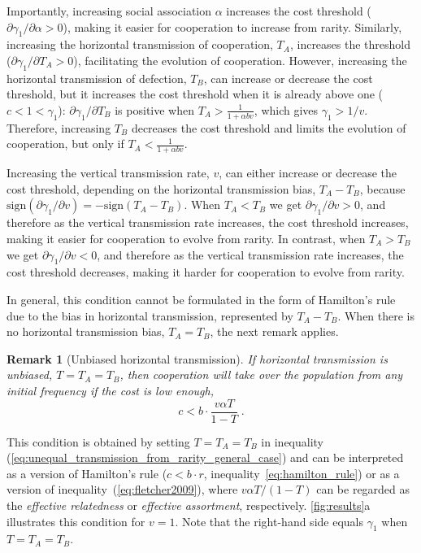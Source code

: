 \documentclass[12pt]{extarticle}
\newtheorem{remark}{Remark}
\begin{document}
Importantly, increasing social association $\alpha$ increases the cost threshold ($\partial \gamma_1 / \partial \alpha > 0$), making it easier for cooperation to increase from rarity.
Similarly, increasing the horizontal transmission of cooperation, $T_A$, increases the threshold ($\partial \gamma_1 / \partial T_A > 0$), facilitating the evolution of cooperation.
However, increasing the horizontal transmission of defection, $T_B$, can increase or decrease the cost threshold, but it increases the cost threshold when it is already above one ($c<1<\gamma_1$): $\partial\gamma_1/\partial T_B$ is positive when $T_A > \frac{1}{1+\alpha b v}$, which gives $\gamma_1>1/v$. 
Therefore, increasing $T_B$ decreases the cost threshold and limits the evolution of cooperation, but only if $T_A < \frac{1}{1+\alpha b v}$.

Increasing the vertical transmission rate, $v$, can either increase or decrease the cost threshold, depending on the horizontal transmission bias, $T_A-T_B$, because $\text{sign}(\partial \gamma_1 / \partial v) = -\text{sign}(T_A-T_B)$.
When $T_A<T_B$ we get $\partial \gamma_1 / \partial v >0$, and therefore as the vertical transmission rate increases, the cost threshold increases, making it easier for cooperation to evolve from rarity. 
In contrast, when $T_A > T_B$ we get $\partial \gamma_1 / \partial v <0$, and therefore as the vertical transmission rate increases, the cost threshold decreases, making it harder for cooperation to evolve from rarity.

In general, this condition cannot be formulated in the form of Hamilton's rule due to the bias in horizontal transmission, represented by $T_A-T_B$.
When there is no horizontal transmission bias, $T_A=T_B$, the next remark applies.
\\

\begin{remark}[Unbiased horizontal transmission] 
\label{remark:equal_transmission}
If horizontal transmission is unbiased, $T=T_A=T_B$, then cooperation will take over the population from any initial frequency if the cost is low enough,
\begin{equation}
\label{eq:equal_transmission}
c < b \cdot \frac{v \alpha T}{1-T} \;.
\end{equation}
\end{remark}
This condition is obtained by setting $T=T_A=T_B$ in inequality (\ref{eq:unequal_transmission_from_rarity_general_case}) and can be interpreted as a version of Hamilton's rule  ($c<b\cdot r$, inequality~\ref{eq:hamilton_rule}) or as a version of inequality~(\ref{eq:fletcher2009}), where $v \alpha T/(1-T)$ can be regarded as the \emph{effective relatedness} or \emph{effective assortment}, respectively.
\autoref{fig:results}a illustrates this condition for $v=1$. Note that the right-hand side equals $\gamma_1$ when $T=T_A=T_B$.
\end{document}
